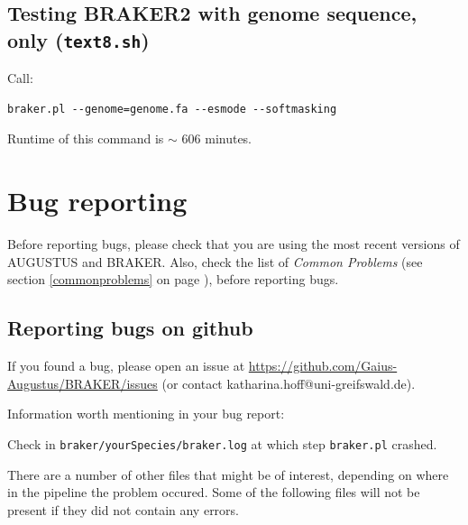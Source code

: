 \documentclass[a4paper,10pt]{report}
\begin{document}
\section{Testing BRAKER2 with genome sequence, only (\texttt{text8.sh})}

Call:

\begin{verbatim}
braker.pl --genome=genome.fa --esmode --softmasking
\end{verbatim}

Runtime of this command is $\sim$ 606 minutes.

\chapter{Bug reporting}

Before reporting bugs, please check that you are using the most recent versions of AUGUSTUS and BRAKER. Also, check the list of \textit{Common Problems} (see section \ref{commonproblems} on page \pageref{commonproblems}), before reporting bugs.

\section{Reporting bugs on github}

If you found a bug, please open an issue at \url{https://github.com/Gaius-Augustus/BRAKER/issues} (or contact katharina.hoff@uni-greifswald.de).

Information worth mentioning in your bug report:

Check in \texttt{braker/yourSpecies/braker.log} at which step \texttt{braker.pl} crashed.

There are a number of other files that might be of interest, depending on where in the pipeline the
problem occured. Some of the following files will not be present if they did not contain any errors.
\end{document}
